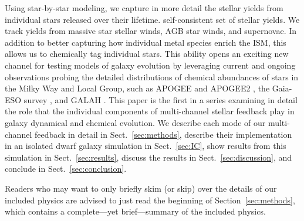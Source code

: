\documentclass[twocolumn]{aastex61}
\begin{document}
Using star-by-star modeling, we capture in more detail the stellar yields from individual stars released over their lifetime. self-consistent set of stellar yields. 
    We track yields from massive star stellar winds, AGB star winds, and supernovae. 
In addition to better capturing how individual metal species enrich the ISM, this allows us to chemically tag individual stars. This ability opens an exciting new channel for testing models of galaxy evolution by leveraging current and ongoing observations probing the detailed 
   distributions of
chemical abundances of stars in the Milky Way and Local Group, such as APOGEE and APOGEE2 \citep{APOGEE2010,APOGEE}, the Gaia-ESO survey \citep{Gaia}, and GALAH \citep{GALAH}.
This paper is the first in a series examining in detail the role that the individual components of multi-channel stellar feedback play in galaxy dynamical and chemical evolution. 
We describe each mode of our multi-channel feedback 
in detail in Sect.~\ref{sec:methods}, describe their implementation in an isolated dwarf galaxy simulation
   in Sect.~\ref{sec:IC}, show results from this simulation in Sect.~\ref{sec:results}, discuss the 
   results in Sect.~\ref{sec:discussion}, and conclude in Sect.~\ref{sec:conclusion}.

Readers who may want to only briefly skim (or skip) over the details of our included physics are advised to just read the beginning of Section~\ref{sec:methods}, which contains a complete---yet brief---summary of the included physics.
\end{document}
